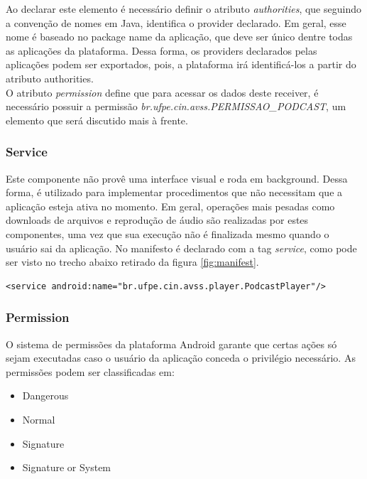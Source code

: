 \documentclass[a4paper,12pt]{article}
\begin{document}
Ao declarar este elemento é necessário definir o atributo \textit{authorities}, que seguindo a convenção de nomes em Java, identifica o provider declarado. Em geral, esse nome é baseado no package name da aplicação, que deve ser único dentre todas as aplicações da plataforma. Dessa forma, os providers declarados pelas aplicações podem ser exportados, pois, a plataforma irá identificá-los a partir do atributo authorities.\\

O atributo \textit{permission} define que para acessar os dados deste receiver, é necessário possuir a permissão \textit{br.ufpe.cin.avss.PERMISSAO\_PODCAST}, um elemento que será discutido mais à frente.




\subsubsection{Service}



Este componente não provê uma interface visual e roda em background. Dessa forma, é utilizado para implementar procedimentos  que não necessitam que a aplicação esteja ativa no momento. Em geral, operações mais pesadas como downloads de arquivos e reprodução de áudio são realizadas por estes componentes, uma vez que sua execução não é finalizada mesmo quando o usuário sai da aplicação. No manifesto é declarado com a tag \textit{service}, como pode ser visto no trecho abaixo retirado da figura \ref{fig:manifest}.
{\fontsize{9pt}{12pt}
\begin{verbatim}
<service android:name="br.ufpe.cin.avss.player.PodcastPlayer"/>
\end{verbatim}
}

\subsubsection{Permission}
O sistema de permissões da plataforma Android garante que certas ações só sejam executadas caso o usuário da aplicação conceda o privilégio necessário. As permissões podem ser classificadas em:
\begin{itemize}
    \item {Dangerous}
    \item {Normal}
    \item {Signature}
    \item {Signature or System}
\end{itemize}
\end{document}
